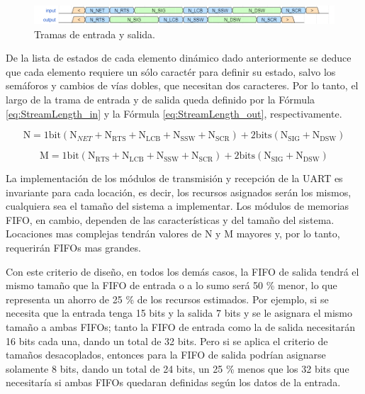	\begin{figure}[H]
		\centering
		\includegraphics[width=1\textwidth]{Figuras/Tramas.png}
		\centering\caption{Tramas de entrada y salida.}
		\label{fig:Stream}
	\end{figure}
	
	De la lista de estados de cada elemento dinámico dado anteriormente se deduce que cada elemento requiere un sólo caractér para definir su estado, salvo los semáforos y cambios de vías dobles, que necesitan dos caracteres. Por lo tanto, el largo de la trama de entrada y de salida queda definido por la Fórmula \ref{eq:StreamLength_in} y la Fórmula \ref{eq:StreamLength_out}, respectivamente.
	
	\begin{equation} 
		\label{eq:StreamLength_in}
		\text{N} = 1\text{bit} (\text{N}_{NET}+\text{N}_{\text{RTS}}+\text{N}_{\text{LCB}}+\text{N}_{\text{SSW}}+\text{N}_{\text{SCR}})+2\text{bits} (\text{N}_{\text{SIG}}+\text{N}_{\text{DSW}})
	\end{equation}
	
	\begin{equation} 
		\label{eq:StreamLength_out}
		\text{M} = 1\text{bit} (\text{N}_{\text{RTS}}+\text{N}_{\text{LCB}}+\text{N}_{\text{SSW}}+\text{N}_{\text{SCR}})+2\text{bits} (\text{N}_{\text{SIG}}+\text{N}_{\text{DSW}})
	\end{equation}
	
	La implementación de los módulos de transmisión y recepción de la UART es invariante para cada locación, es decir, los recursos asignados serán los mismos, cualquiera sea el tamaño del sistema a implementar. Los módulos de memorias FIFO, en cambio, dependen de las características y del tamaño del sistema. Locaciones mas complejas tendrán valores de N y M mayores y, por lo tanto, requerirán FIFOs mas grandes. 
	
	Con este criterio de diseño, en todos los demás casos, la FIFO de salida tendrá el mismo tamaño que la FIFO de entrada o a lo sumo será 50 \% menor, lo que representa un ahorro de 25 \% de los recursos estimados. Por ejemplo, si se necesita que la entrada tenga 15 bits y la salida 7 bits y se le asignara el mismo tamaño a ambas FIFOs; tanto la FIFO de entrada como la de salida necesitarán 16 bits cada una, dando un total de 32 bits. Pero si se aplica el criterio de tamaños desacoplados, entonces para la FIFO de salida podrían asignarse solamente 8 bits,
	dando un total de 24 bits, un 25 \% menos que los 32 bits que necesitaría si ambas FIFOs quedaran definidas según los datos de la entrada.
	




